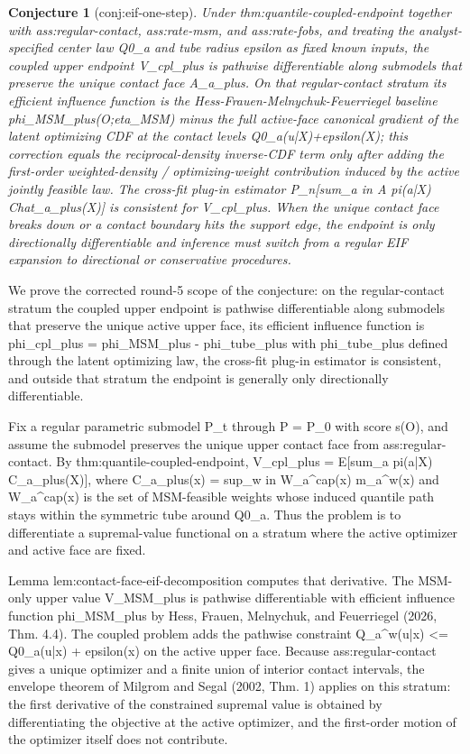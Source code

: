 \documentclass{article}
\newtheorem{conjecture}{Conjecture}
\begin{document}
\begin{conjecture}[conj:eif-one-step]\label{conj:eif-one-step}
Under thm:quantile-coupled-endpoint together with ass:regular-contact, ass:rate-msm, and ass:rate-fobs, and treating the analyst-specified center law Q0_a and tube radius epsilon as fixed known inputs, the coupled upper endpoint V_cpl_plus is pathwise differentiable along submodels that preserve the unique contact face A_a_plus. On that regular-contact stratum its efficient influence function is the Hess-Frauen-Melnychuk-Feuerriegel baseline phi_MSM_plus(O;eta_MSM) minus the full active-face canonical gradient of the latent optimizing CDF at the contact levels Q0_a(u|X)+epsilon(X); this correction equals the reciprocal-density inverse-CDF term only after adding the first-order weighted-density / optimizing-weight contribution induced by the active jointly feasible law. The cross-fit plug-in estimator P_n[sum_{a in A} pi(a|X) Chat_a_plus(X)] is consistent for V_cpl_plus. When the unique contact face breaks down or a contact boundary hits the support edge, the endpoint is only directionally differentiable and inference must switch from a regular EIF expansion to directional or conservative procedures.
\end{conjecture}
We prove the corrected round-5 scope of the conjecture: on the regular-contact stratum the coupled upper endpoint is pathwise differentiable along submodels that preserve the unique active upper face, its efficient influence function is phi_cpl_plus = phi_MSM_plus - phi_tube_plus with phi_tube_plus defined through the latent optimizing law, the cross-fit plug-in estimator is consistent, and outside that stratum the endpoint is generally only directionally differentiable.

Fix a regular parametric submodel {P_t} through P = P_0 with score s(O), and assume the submodel preserves the unique upper contact face from ass:regular-contact. By thm:quantile-coupled-endpoint, V_cpl_plus = E[sum_a pi(a|X) C_a_plus(X)], where C_a_plus(x) = sup_{w in W_a^cap(x)} m_a^w(x) and W_a^cap(x) is the set of MSM-feasible weights whose induced quantile path stays within the symmetric tube around Q0_a. Thus the problem is to differentiate a supremal-value functional on a stratum where the active optimizer and active face are fixed.

Lemma lem:contact-face-eif-decomposition computes that derivative. The MSM-only upper value V_MSM_plus is pathwise differentiable with efficient influence function phi_MSM_plus by Hess, Frauen, Melnychuk, and Feuerriegel (2026, Thm. 4.4). The coupled problem adds the pathwise constraint Q_a^w(u|x) <= Q0_a(u|x) + epsilon(x) on the active upper face. Because ass:regular-contact gives a unique optimizer and a finite union of interior contact intervals, the envelope theorem of Milgrom and Segal (2002, Thm. 1) applies on this stratum: the first derivative of the constrained supremal value is obtained by differentiating the objective at the active optimizer, and the first-order motion of the optimizer itself does not contribute.
\end{document}
